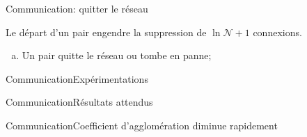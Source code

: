 \begin{frame}{Communication}{\SPRAY : quitter le réseau}

  Le départ d'un pair engendre la suppression de $\ln\mathcal{N}+1$ connexions.

  \vspace{0.5cm}

  \begin{minipage}{0.6\textwidth}
    \begin{enumerate}[(a)]
    \item Un pair quitte le réseau ou tombe en panne;
    \end{enumerate}
  \end{minipage}
  \hfill
  \begin{minipage}{0.37\textwidth}
    \begin{center}
      
    \end{center}
  \end{minipage}

  \vspace{0.5cm}
  \large
  \begin{itemize}
  \end{itemize}
 
\end{frame}


\begin{frame}{Communication}{Expérimentations}


\end{frame}

\begin{frame}{Communication}{Résultats attendus}
\end{frame}

\begin{frame}{Communication}{Coefficient d'agglomération diminue rapidement}

\end{frame}